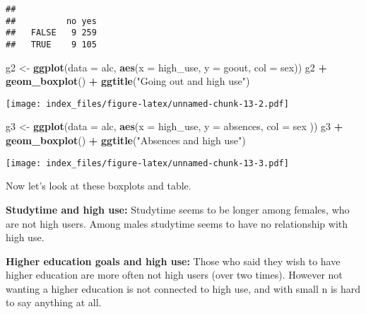 \documentclass[]{article}
\newenvironment{Shaded}{\begin{snugshade}}{\end{snugshade}}
\newcommand{\KeywordTok}[1]{\textcolor[rgb]{0.13,0.29,0.53}{\textbf{#1}}}
\newcommand{\DataTypeTok}[1]{\textcolor[rgb]{0.13,0.29,0.53}{#1}}
\newcommand{\StringTok}[1]{\textcolor[rgb]{0.31,0.60,0.02}{#1}}
\newcommand{\OperatorTok}[1]{\textcolor[rgb]{0.81,0.36,0.00}{\textbf{#1}}}
\newcommand{\NormalTok}[1]{#1}
\begin{document}
\begin{Shaded}
\end{Shaded}

\begin{verbatim}
##        
##          no yes
##   FALSE   9 259
##   TRUE    9 105
\end{verbatim}

\begin{Shaded}
\begin{Highlighting}[]
\NormalTok{g2 <-}\StringTok{ }\KeywordTok{ggplot}\NormalTok{(}\DataTypeTok{data =}\NormalTok{ alc, }\KeywordTok{aes}\NormalTok{(}\DataTypeTok{x =}\NormalTok{ high_use, }\DataTypeTok{y =}\NormalTok{ goout, }\DataTypeTok{col =}\NormalTok{ sex)) }
\NormalTok{g2 }\OperatorTok{+}\StringTok{ }\KeywordTok{geom_boxplot}\NormalTok{() }\OperatorTok{+}\StringTok{ }\KeywordTok{ggtitle}\NormalTok{(}\StringTok{"Going out and high use"}\NormalTok{)}
\end{Highlighting}
\end{Shaded}

\texttt{[image: index\_files/figure-latex/unnamed-chunk-13-2.pdf]}

\begin{Shaded}
\begin{Highlighting}[]
\NormalTok{g3 <-}\StringTok{ }\KeywordTok{ggplot}\NormalTok{(}\DataTypeTok{data =}\NormalTok{ alc, }\KeywordTok{aes}\NormalTok{(}\DataTypeTok{x =}\NormalTok{ high_use, }\DataTypeTok{y =}\NormalTok{ absences, }\DataTypeTok{col =}\NormalTok{ sex )) }
\NormalTok{g3 }\OperatorTok{+}\StringTok{  }\KeywordTok{geom_boxplot}\NormalTok{() }\OperatorTok{+}\StringTok{ }\KeywordTok{ggtitle}\NormalTok{(}\StringTok{"Absences and high use"}\NormalTok{)}
\end{Highlighting}
\end{Shaded}

\texttt{[image: index\_files/figure-latex/unnamed-chunk-13-3.pdf]}

Now let's look at these boxplots and table.

\textbf{Studytime and high use:} Studytime seems to be longer among
females, who are not high users. Among males studytime seems to have no
relationship with high use.

\textbf{Higher education goals and high use:} Those who said they wish
to have higher education are more often not high users (over two times).
However not wanting a higher education is not connected to high use, and
with small n is hard to say anything at all.
\end{document}
